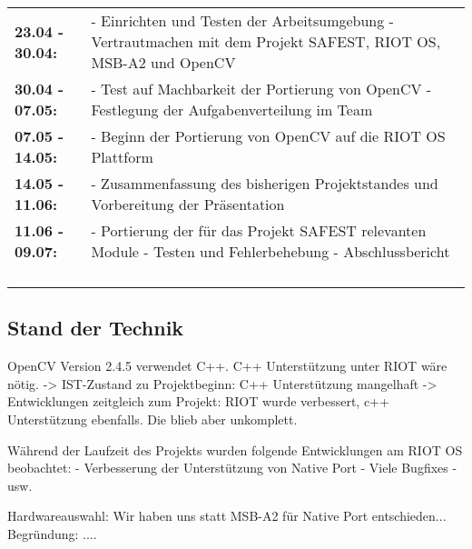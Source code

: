 \documentclass[10pt,a4paper]{article}
\begin{document}
\renewcommand{\arraystretch}{2}
\begin{tabularx}{\textwidth}{lX}
\textbf{23.04 - 30.04:} & 
- Einrichten und Testen der Arbeitsumgebung \newline
- Vertrautmachen mit dem Projekt SAFEST, RIOT OS, MSB-A2 und OpenCV \\

\textbf{30.04 - 07.05:} & 
- Test auf Machbarkeit der Portierung von OpenCV \newline
- Festlegung der Aufgabenverteilung im Team \\

\textbf{07.05 - 14.05:} & 
- Beginn der Portierung von OpenCV auf die RIOT OS Plattform \\

\textbf{14.05 - 11.06:} & 
- Zusammenfassung des bisherigen Projektstandes und Vorbereitung der Präsentation \\

\textbf{11.06 - 09.07:} & 
- Portierung der für das Projekt SAFEST relevanten Module \newline
- Testen und Fehlerbehebung \newline
- Abschlussbericht \\ 
\\\\\\\\
\end{tabularx}


\subsection{Stand der Technik}

OpenCV Version 2.4.5 verwendet C++.
C++ Unterstützung unter RIOT wäre nötig.
-> IST-Zustand zu Projektbeginn: C++ Unterstützung mangelhaft
-> Entwicklungen zeitgleich zum Projekt: RIOT wurde verbessert, c++ Unterstützung ebenfalls. Die blieb aber unkomplett.

Während der Laufzeit des Projekts wurden folgende Entwicklungen am RIOT OS beobachtet: 
- Verbesserung der Unterstützung von Native Port
- Viele Bugfixes
- usw.

Hardwareauswahl: Wir haben uns statt MSB-A2 für Native Port entschieden...
Begründung: ....

\newpage
\end{document}
